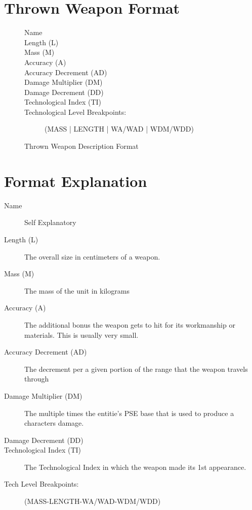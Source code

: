 \clearpage
\section{Thrown Weapon Format}

\begin{figure}[hb]
\centering
\caption{Thrown Weapon Description Format}
	\begin{description}
		\item[Name]
		\item[Length (L)]
		\item[Mass (M)]
		\item[Accuracy (A)]
		\item[Accuracy Decrement (AD)]
		\item[Damage Multiplier (DM)]
		\item[Damage Decrement (DD)]
		\item[Technological Index (TI)]
		\item[Technological Level Breakpoints:]
		(MASS | LENGTH | WA/WAD | WDM/WDD)
	\end{description}
\end{figure}

\section{Format Explanation}

\begin{description}
	\item[Name]
	Self Explanatory
	\item[Length (L)]
	The overall size in centimeters of a weapon.
	\item[Mass (M)]
	The mass of the unit in kilograms
	\item[Accuracy (A)]
	The additional bonus the weapon gets to hit for its workmanship or
	materials. This is usually very small.
	\item[Accuracy Decrement (AD)]
	The decrement per a given portion of the range that the weapon travels through
	\item[Damage Multiplier (DM)]
	The multiple times the entitie's PSE base that is used to produce a characters
	damage.
	\item[Damage Decrement (DD)]
	\item[Technological Index (TI)]
	The Technological Index in which the weapon made its 1st appearance.
	\item[Tech Level Breakpoints:]
	(MASS-LENGTH-WA/WAD-WDM/WDD)
\end{description}

